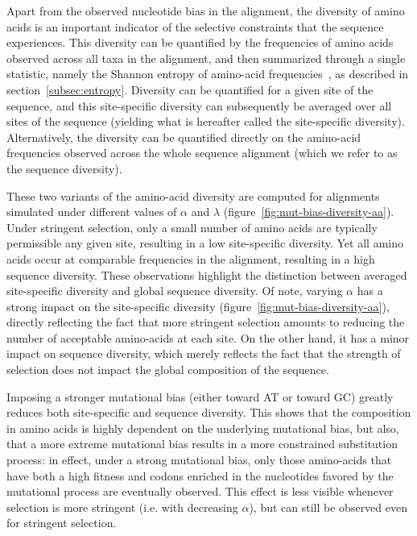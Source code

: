 Apart from the observed nucleotide bias in the alignment, the diversity of amino acids is an important indicator of the selective constraints that the sequence experiences.
This diversity can be quantified by the frequencies of amino acids observed across all taxa in the alignment, and then summarized through a single statistic, namely the Shannon entropy of amino-acid frequencies~\citep{Goldstein2017}, as described in section~\ref{subsec:entropy}.
Diversity can be quantified for a given site of the sequence, and this site-specific diversity can subsequently be averaged over all sites of the sequence (yielding what is hereafter called the site-specific diversity).
Alternatively, the diversity can be quantified directly on the amino-acid frequencies observed across the whole sequence alignment (which we refer to as the sequence diversity).

These two variants of the amino-acid diversity are computed for alignments simulated under different values of $\alpha$ and $\lambda$ (figure~\ref{fig:mut-bias-diversity-aa}).
Under stringent selection, only a small number of amino acids are typically permissible any given site, resulting in a low site-specific diversity.
Yet all amino acids occur at comparable frequencies in the alignment, resulting in a high sequence diversity.
These observations highlight the distinction between averaged site-specific diversity and global sequence diversity.
Of note, varying $\alpha$ has a strong impact on the site-specific diversity (figure~\ref{fig:mut-bias-diversity-aa}), directly reflecting the fact that more stringent selection amounts to reducing the number of acceptable amino-acids at each site.
On the other hand, it has a minor impact on sequence diversity, which merely reflects the fact that the strength of selection does not impact the global composition of the sequence.

Imposing a stronger mutational bias (either toward AT or toward GC) greatly reduces both site-specific and sequence diversity.
This shows that the composition in amino acids is highly dependent on the underlying mutational bias, but also, that a more extreme mutational bias results in a more constrained substitution process: in effect, under a strong mutational bias, only those amino-acids that have both a high fitness and codons enriched in the nucleotides favored by the mutational process are eventually observed.
This effect is less visible whenever selection is more stringent (i.e. with decreasing $\alpha$), but can still be observed even for stringent selection.

